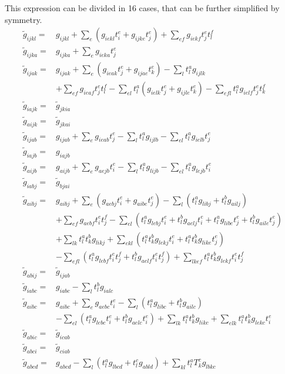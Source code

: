This expression can be divided in 16 cases, that can be further simplified by symmetry.
\begin{align}
  {\tilde g}_{ijkl}=&g_{ijkl}+\sum_{e}(g_{iekl}t_i^e+g_{ijke}t_j^e)+\sum_{ef}g_{iekf}t_j^et_l^f\\
  {\tilde g}_{ijka}=&g_{ijka}+\sum_{e}g_{ieka}t_j^e\\ 
  {\tilde g}_{ijak}=&g_{ijak}+\sum_{e}(g_{ieak}t_j^e+g_{ijae}t_k^e)-\sum_lt_l^ag_{ijlk}\nonumber\\
  &+\sum_{ef}g_{ieaf}t_j^et_l^f-\sum_{el}t_l^a(g_{ielk}t_j^e+g_{ijle}t_k^e)-\sum_{efl}t_l^ag_{ielf}t_j^et_k^f\\
  {\tilde g}_{iajk}=&{\tilde g}_{jkia}\\
  {\tilde g}_{aijk}=&{\tilde g}_{jkai}\\
  {\tilde g}_{ijab}=&g_{ijab}+\sum_{e}g_{ieab}t_j^e-\sum_{l}t_l^ag_{ijlb}-\sum_{el}t_l^ag_{ielb}t_j^e\\
  {\tilde g}_{iajb}=&g_{iajb}\\
  {\tilde g}_{aijb}=&g_{aijb}+\sum_{e}g_{aejb}t_i^e-\sum_{l}t_l^ag_{lijb}-\sum_{el}t_l^ag_{lejb}t_i^e\\
  {\tilde g}_{iabj}=&{\tilde g}_{bjai}\\
  {\tilde g}_{aibj}=&g_{aibj}+\sum_{e}(g_{aebj}t_i^e+g_{aibe}t_j^e)-\sum_{l}(t_l^ag_{libj}+t_l^bg_{ailj})\nonumber\\
  &+\sum_{ef}g_{aebf}t_i^et_j^f-\sum_{el}(t_l^ag_{lebj}t_i^e+t_l^bg_{aelj}t_i^e+t_l^ag_{libe}t_j^e+t_l^bg_{aile}t_j^e)\nonumber\\
  &+\sum_{lk}t_l^at_k^bg_{likj}+\sum_{ekl}(t_l^at_k^bg_{lekj}t_i^e+t_l^at_k^bg_{like}t_j^e)\nonumber\\
  &-\sum_{efl}(t_l^ag_{lebf}t_i^et_j^f+t_l^bg_{aelf}t_i^et_j^f)+\sum_{lkef}t_l^at_k^bg_{lekf}t_i^et_j^f\\
  {\tilde g}_{abij}=&{\tilde g}_{ijab}\\
  {\tilde g}_{iabc}=&g_{iabc}-\sum_{l}t_l^bg_{ialc}\\
  {\tilde g}_{aibc}=&g_{aibc}+\sum_{e}g_{aebc}t_i^e-\sum_l(t_l^ag_{libc}+t_l^bg_{ailc})\nonumber\\
  &-\sum_{el}(t_l^ag_{lebc}t_i^e+t_l^bg_{aelc}t_i^e)+\sum_{lk}t_l^at_k^bg_{likc}+\sum_{elk}t_l^at_k^bg_{lekc}t_i^e\\
  {\tilde g}_{abic}=&{\tilde g}_{icab}\\
  {\tilde g}_{abci}=&{\tilde g}_{ciab}\\
  {\tilde g}_{abcd}=&g_{abcd}-\sum_l(t_l^ag_{lbcd}+t_l^cg_{abld})+\sum_{kl}t_l^aT_k^cg_{lbkc}
\end{align}


